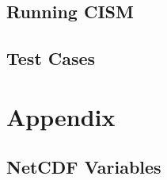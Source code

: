 \chapter{Running CISM}
\renewcommand{\dir}{run_cism}


\chapter{Test Cases}
\label{chp:testcases}
\renewcommand{\dir}{tests}




%


%

%

%

\part{Appendix}
\label{ch:appendix}
\appendix
\renewcommand{\dir}{ug}
\chapter{NetCDF Variables}
\label{ch:appendix_vars}

%
%
%
\renewcommand{\dir}{ext}


